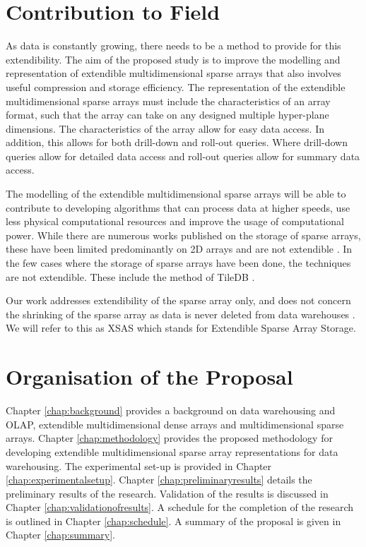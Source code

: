 \section{Contribution to Field}
As data is constantly growing, there needs to be a method to provide for this extendibility. The aim of the proposed study is to improve the modelling and representation of extendible multidimensional sparse arrays that also involves useful compression and storage efficiency. The representation of the extendible multidimensional sparse arrays must include the characteristics of an array format, such that the array can take on any designed multiple hyper-plane dimensions. The characteristics of the array allow for easy data access. In addition, this allows for both drill-down and roll-out queries. Where drill-down queries allow for detailed data access and roll-out queries allow for summary data access.

The modelling of the extendible multidimensional sparse arrays will be able to contribute to developing algorithms that can process data at higher speeds, use less physical computational resources and improve the usage of computational power. While there are numerous works published on the storage of sparse arrays, these have been limited predominantly on 2D arrays and are not extendible \cite{wang:2014sar}. In the few cases where the storage of sparse arrays have been done, the techniques are not extendible. These include the method of TileDB \cite{tiledb:tm101}.

Our work addresses extendibility of the sparse array only, and does not concern the shrinking of the sparse array as data is never deleted from data warehouses \cite{golfarelli:2009:dwd}. We will refer to this as XSAS which stands for Extendible Sparse Array Storage.

\section{Organisation of the Proposal}%
Chapter \ref{chap:background} provides a background on data warehousing and OLAP, extendible multidimensional dense arrays and multidimensional sparse arrays. Chapter \ref{chap:methodology} provides the proposed methodology for developing extendible multidimensional sparse array representations for data warehousing. The experimental set-up is provided in Chapter \ref{chap:experimentalsetup}. Chapter \ref{chap:preliminaryresults} details the preliminary results of the research. Validation of the results is discussed in Chapter \ref{chap:validationofresults}. %
A schedule for the completion of the research is outlined in Chapter \ref{chap:schedule}. A summary of the proposal is given in Chapter \ref{chap:summary}. 